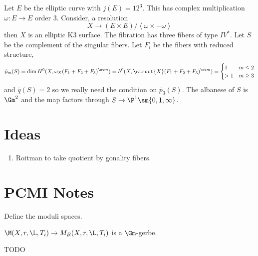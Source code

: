 \documentclass[12pt]{article}
\theoremstyle{plain}
\begin{document}
\begin{example}
Let $E$ be the elliptic curve with $j(E) = 12^3$. This has complex multiplication $\omega : E \to E$ order $3$. Consider, a resolution
\[ X \to (E \times E) / \left< \omega \times - \omega \right> \]
then $X$ is an elliptic K3 surface. The fibration has three fibers of type $IV^*$. Let $S$ be the complement of the singular fibers. Let $F_i$ be the fibers with reduced structure,
\[ \bar{p}_m(S) = \dim H^0(X, \omega_X(F_1 + F_2 + F_3)^{\ot m}) = h^0(X, \struct{X}(F_1 + F_2 + F_3)^{\ot m}) = 
\begin{cases}
1 & m \le 2
\\
> 1 & m \ge 3
\end{cases} \] 
and $\bar{q}(S) = 2$ so we really need the condition on $\bar{p}_3(S)$. The albanese of $S$ is $\Gm^2$ and the map factors through $S \to \P^1 \sm \{ 0,1,\infty \}$.
\end{example}

\section{Ideas}

\begin{enumerate}
\item Roitman to take quotient by gonality fibers. 
\end{enumerate}


\section{PCMI Notes}

Define the moduli spaces.

\begin{prop}
$\M(X, r, \L, T_i) \to M_B(X, r, \L, T_i)$ is a $\Gm$-gerbe. 
\end{prop}

{\color{red} TODO}
\end{document}
